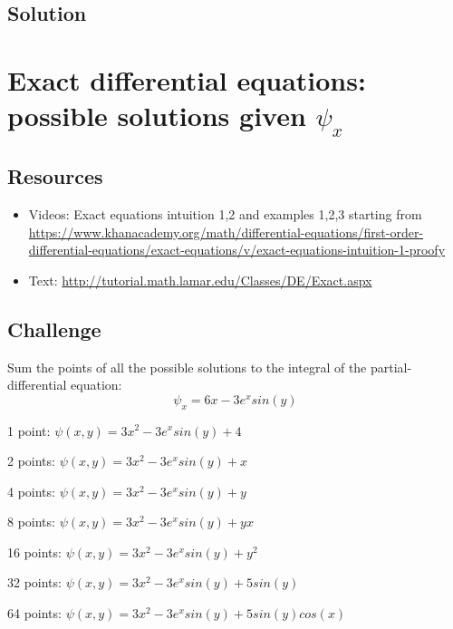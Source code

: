 \subsection*{Solution}
\six{}

\timebox




\newpage
\section{Exact differential equations: possible solutions given $\psi_x$}

\subsection*{Resources}
\begin{itemize}
    \item Videos: Exact equations intuition 1,2 and examples 1,2,3 starting from \url{https://www.khanacademy.org/math/differential-equations/first-order-differential-equations/exact-equations/v/exact-equations-intuition-1-proofy}
    \item Text: \url{http://tutorial.math.lamar.edu/Classes/DE/Exact.aspx}
\end{itemize}

\subsection*{Challenge}
Sum the points of all the possible solutions to the integral of the partial-differential equation:
\begin{equation}
    \psi_x = 6x - 3e^x sin(y)
\end{equation}

1 point: $\psi(x,y) = 3x^2-3e^x sin(y) + 4$

2 points: $\psi(x,y) = 3x^2-3e^x sin(y) + x$

4 points: $\psi(x,y) = 3x^2-3e^x sin(y) + y$

8 points: $\psi(x,y) = 3x^2-3e^x sin(y) + yx$

16 points: $\psi(x,y) = 3x^2-3e^x sin(y) + y^2$

32 points: $\psi(x,y) = 3x^2-3e^x sin(y) + 5 sin(y)$

64 points: $\psi(x,y) = 3x^2-3e^x sin(y) + 5 sin(y)cos(x)$

